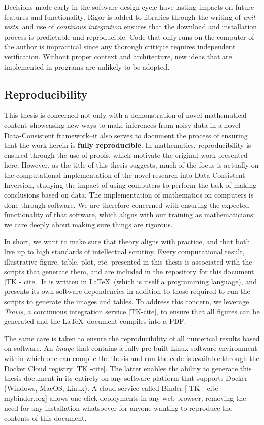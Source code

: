 Decisions made early in the software design cycle have lasting impacts on future features and functionality.
Rigor is added to libraries through the writing of \emph{unit tests}, and use of \emph{continous integration} ensures that the download and installation process is predictable and reproducible.
Code that only runs on the computer of the author is impractical since any thorough critique requires independent verification.
Without proper context and architecture, new ideas that are implemented in programs are unlikely to be adopted.

\subsection{Reproducibility}
This thesis is concerned not only with a demonstration of novel mathematical content\---showcasing new ways to make inferences from noisy data in a novel Data-Consistent framework\---it also serves to document the process of ensuring that the work herein is \textbf{fully reproducible}.
In mathematics, reproducibility is ensured through the use of proofs, which motivate the original work presented here.
However, as the title of this thesis suggests, much of the focus is actually on the computational implementation of the novel research into Data Consistent Inversion, studying the impact of using computers to perform the task of making conclusions based on data.
The implementation of mathematics on computers is done through software.
We are therefore concerned with ensuring the expected functionality of that software, which aligns with our training as mathematicians; we care deeply about making sure things are rigorous.

In short, we want to make sure that theory aligns with practice, and that both live up to high standards of intellectual scrutiny.
Every computational result, illustrative figure, table, plot, etc. presented in this thesis is associated with the scripts that generate them, and are included in the  repository for this document [TK - cite].
It is written in \LaTeX~(which is itself a programming language), and presents its own software dependencies in addition to those required to run the scripts to generate the images and tables.
To address this concern, we leverage \emph{Travis}, a continuous integration service [TK-cite], to ensure that all figures can be generated and the \LaTeX\, document compiles into a PDF.

The same care is taken to ensure the reproducibility of all numerical results based on software.
An \emph{image} that contains a fully pre-built Linux software environment within which one can compile the thesis and run the code is available through the Docker Cloud registry [TK -cite].
The latter enables the ability to generate this thesis document in its entirety on any software platform that supports Docker (Windows, MacOS, Linux).
A cloud service called Binder [ TK - cite mybinder.org] allows one-click deployments in any web-browser, removing the need for any installation whatsoever for anyone wanting to reproduce the contents of this document. 

